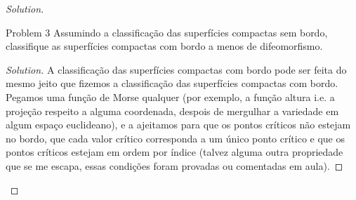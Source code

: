 \begin{proof}[Solution]
\iffalse\begin{proof}[Solution]\leavevmode
	Considere a carta \(\varphi_0:\{z_0=1\}\subset\mathbb{C}P^{1}\to \mathbb{C}\), \([1:z]\mapsto z\). Obtemos
\begin{align*}
\frac{\partial }{\partial z}(f \circ \varphi_0^{-1})&=\frac{(1+|z|^2)^m \frac{\partial |1+z^m|^2}{\partial z}-m(1+|z|^2)^{m-1}\cdot \bar{z}\cdot |1+z^m|^2}{(1+|z|^2)^{2m}}.
\end{align*}
Calculamos com calma
\[\frac{\partial |1+z^m|^2}{\partial z}=\frac{\partial }{\partial z}(1+z^m)\overline{(1+z^m)}=(1+z^m)\cdot 0+mz^{m-1}\overline{(1+z^m)}\]
E sustituimos:
\begin{align*}
\frac{\partial }{\partial z}(f \circ \varphi_0^{-1})&=\frac{(1+|z|^2)^m \cdot mz^{m-1}\overline{(1+z^m)}-m(1+|z|^2)^{m-1}\cdot \bar{z}\cdot |1+z^m|^2}{(1+|z|^2)^{2m}}.
\end{align*}
\end{proof}\fi

\begin{thing1}{Problem 3}\label{prob:3}\leavevmode
Assumindo a classificação das superfícies compactas sem bordo, classifique as superfícies compactas com bordo a menos de difeomorfismo.
\end{thing1}

\begin{proof}[Solution]\leavevmode


A classificação das superfícies compactas com bordo pode ser feita do mesmo jeito que fizemos a classificação das superfícies compactas com bordo. Pegamos uma função de Morse qualquer (por exemplo, a função altura i.e. a projeção respeito a alguma coordenada, despois de mergulhar a variedade em algum espaço euclideano), e a ajeitamos para que os pontos críticos não estejam no bordo, que cada valor crítico corresponda a um único ponto crítico e que os pontos críticos estejam em ordem por índice (talvez alguma outra propriedade que se me escapa, essas condições foram provadas ou comentadas em aula).


\end{proof}
\end{proof}
